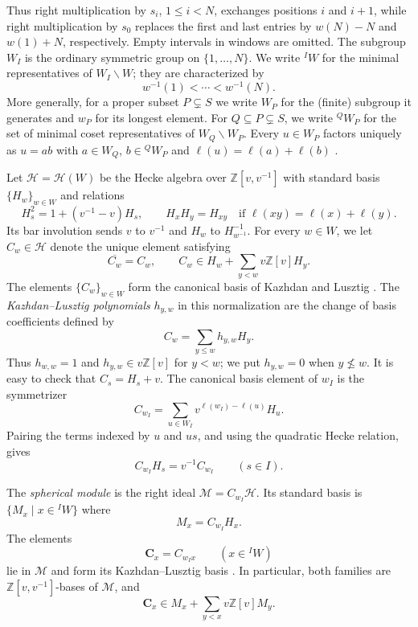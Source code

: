 \documentclass[11pt,a4paper,reqno]{amsart}
\numberwithin{equation}{section}
\theoremstyle{definition}
\newtheorem{definition}[theorem]{Definition}
\theoremstyle{remark}
\theoremstyle{plain}
\newcommand{\C}{\mathbf C}
\newcommand{\M}{\mathcal M}
\begin{document}
Thus right multiplication by $s_i$, $1\leq i<N$, exchanges positions
$i$ and $i+1$, while right multiplication by $s_0$ replaces the first and
last entries by $w(N)-N$ and $w(1)+N$, respectively.
Empty intervals in windows are omitted.
The subgroup $W_I$ is the ordinary symmetric group on
$\{1,\ldots,N\}$. We write $ {}^I W$ for the minimal representatives
of $W_I\backslash W$; they are characterized by
\begin{equation}\label{eq: char representatives}
   w^{-1}(1)<\cdots<w^{-1}(N).  
\end{equation}
\color{black}More generally, for a proper subset $P\subsetneq S$ we write $W_P$ for the
(finite) subgroup it generates and $w_P$ for its longest element. For
$Q\subseteq P\subsetneq S$, we write ${}^QW_P$ for the set of minimal coset
representatives of  $W_Q\backslash W_P$. Every $u\in W_P$ factors
uniquely as $u=ab$ with $a\in W_Q$, $b\in{}^QW_P$ and
$\ell(u)=\ell(a)+\ell(b)$ \cite[Proposition~2.4.4]{BB}.
 


Let $\mathcal H=\mathcal H(W)$ be the Hecke algebra over
$\mathbb Z[v,v^{-1}]$ with standard basis $\{H_w\}_{w\in W}$ and relations
\[
 H_s^2=1+(v^{-1}-v)H_s,\qquad
 H_xH_y=H_{xy}\quad\text{if }\ell(xy)=\ell(x)+\ell(y).
\]
Its bar involution sends $v$ to $v^{-1}$ and $H_w$ to
$H_{w^{-1}}^{-1}$.
 For every $w\in W$, we let $C_w\in\mathcal H$ denote the  unique element  
satisfying
\[
 \overline{C_w}=C_w,\qquad
 C_w\in H_w+\sum_{y<w}v\mathbb Z[v]H_y.
\]
The elements $\{C_w\}_{w\in W}$ form the canonical basis of
Kazhdan and Lusztig \cite{KL}.
The \emph{Kazhdan--Lusztig polynomials} $h_{y,w}$ in this normalization are
the change of basis coefficients defined by
\begin{equation}\label{eq:KL-coefficients}
 C_w=\sum_{y\leq w}h_{y,w}H_y.
\end{equation}
Thus $h_{w,w}=1$ and $h_{y,w}\in v\mathbb Z[v]$ for $y<w$;
we put $h_{y,w}=0$ when $y\not\leq w$.
It is easy to check that $C_s=H_s+v$.
The canonical basis element of $w_I$ is the symmetrizer \cite[Proposition~2.9]{Soergel}
\[
 C_{w_I}=\sum_{u\in W_I}v^{\ell(w_I)-\ell(u)}H_u.
\]
Pairing the terms indexed by $u$ and $us$, and using the quadratic
Hecke relation, gives
\begin{equation}\label{eq:finite-symmetrizer-eigenrelation}
 C_{w_I}H_s=v^{-1}C_{w_I}\qquad(s\in I).
\end{equation}

% 
The \emph{spherical module} is the right ideal $\M=C_{w_I}\mathcal H$. 
Its standard basis is $\{M_x \mid x\in {}^IW\}$ where
\[
 M_x=C_{w_I}H_x.
\]
The elements
\[
 \C_x=C_{w_Ix}\qquad(x\in{}^I W)
\]
lie in $\M$ and form its Kazhdan--Lusztig basis
\cite[Theorem~3.1 and Proposition~3.4]{Soergel}. In particular, both
families are $\mathbb Z[v,v^{-1}]$-bases of $\M$, and
\[
 \C_x\in M_x+\sum_{y<x}v\mathbb Z[v]M_y.
\]
\end{document}
